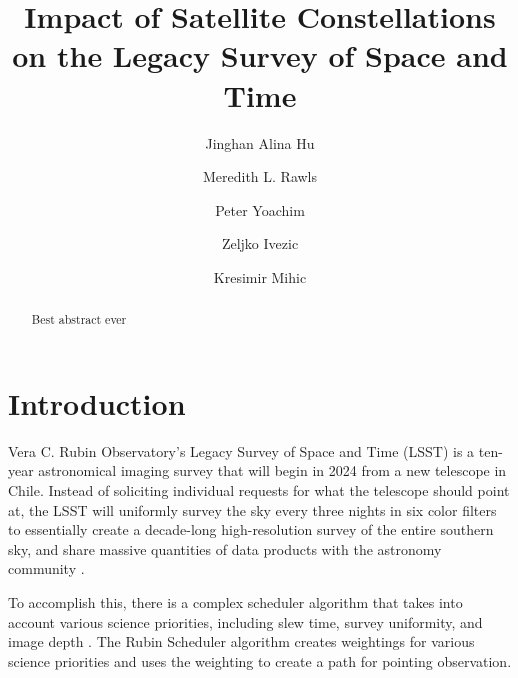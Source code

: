 \documentclass[linenumbers]{aastex631}
\begin{document}
\title{Impact of Satellite Constellations on the Legacy Survey of Space and Time}

\author[0000-0002-8400-1910]{Jinghan Alina Hu}
\author[0000-0003-1305-7308]{Meredith L. Rawls}
\author[0000-0003-2874-6464]{Peter Yoachim}
\author{Zeljko Ivezic}
\author{Kresimir Mihic}


\begin{abstract}
Best abstract ever

\end{abstract}


\section{Introduction} \label{sec:intro}

Vera C. Rubin Observatory's Legacy Survey of Space and Time (LSST) is a ten-year astronomical imaging survey that will begin in 2024 from a new telescope in Chile. Instead of soliciting individual requests for what the telescope should point at, the LSST will uniformly survey the sky every three nights in six color filters to essentially create a decade-long high-resolution survey of the entire southern sky, and share massive quantities of data products with the astronomy community \citep{overview}.

To accomplish this, there is a complex scheduler algorithm that takes into account various science priorities, including slew time, survey uniformity, and image depth \citep{naghib19}. The Rubin Scheduler algorithm creates weightings for various science priorities and uses the weighting to create a path for pointing observation.
\end{document}
